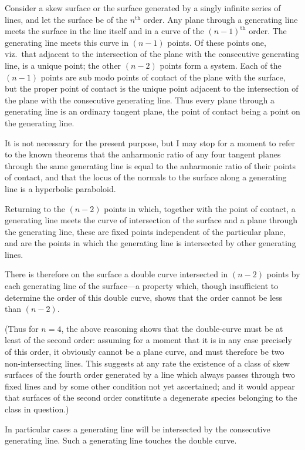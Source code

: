 \documentclass[11pt,a4paper]{book}
\begin{document}
Consider a skew surface or the surface generated by a singly infinite series of lines, and let the surface be of the $n^{\text{th}}$ order. Any plane through a generating line meets the surface in the line itself and in a curve of the $(n-1)^{\text{th}}$ order. The generating line meets this curve in $(n-1)$ points. Of these points one, viz.\ that adjacent to the intersection of the plane with the consecutive generating line, is a unique point; the other $(n-2)$ points form a system. Each of the $(n-1)$ points are sub modo points of contact of the plane with the surface, but the proper point of contact is the unique point adjacent to the intersection of the plane with the consecutive generating line. Thus every plane through a generating line is an ordinary tangent plane, the point of contact being a point on the generating line.

It is not necessary for the present purpose, but I may stop for a moment to refer to the known theorems that the anharmonic ratio of any four tangent planes through the same generating line is equal to the anharmonic ratio of their points of contact, and that the locus of the normals to the surface along a generating line is a hyperbolic paraboloid.

Returning to the $(n-2)$ points in which, together with the point of contact, a generating line meets the curve of intersection of the surface and a plane through the generating line, these are fixed points independent of the particular plane, and are the points in which the generating line is intersected by other generating lines.

There is therefore on the surface a double curve intersected in $(n-2)$ points by each generating line of the surface---a property which, though insufficient to determine the order of this double curve, shows that the order cannot be less than $(n-2)$.

(Thus for $n=4$, the above reasoning shows that the double-curve must be at least of the second order: assuming for a moment that it is in any case precisely of this order, it obviously cannot be a plane curve, and must therefore be two non-intersecting lines. This suggests at any rate the existence of a class of skew surfaces of the fourth order generated by a line which always passes through two fixed lines and by some other condition not yet ascertained; and it would appear that surfaces of the second order constitute a degenerate species belonging to the class in question.)

In particular cases a generating line will be intersected by the consecutive generating line. Such a generating line touches the double curve.
\end{document}
